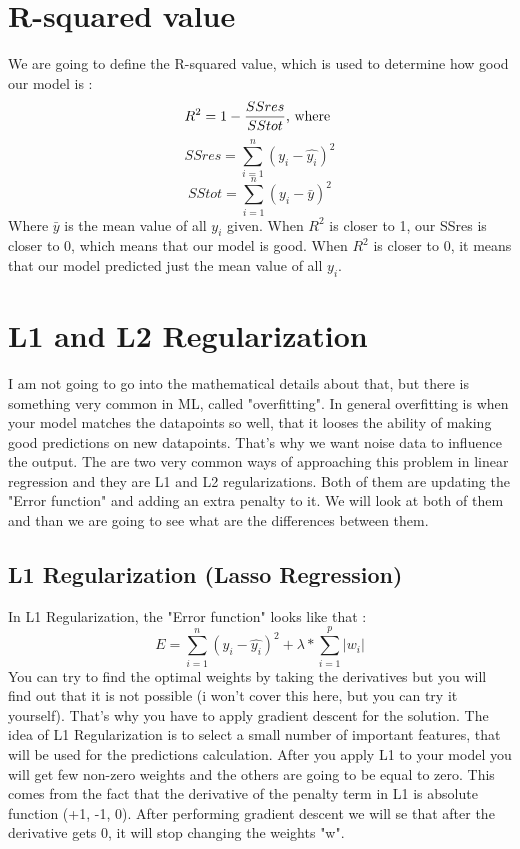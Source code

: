 \documentclass{article}
\begin{document}
\section{R-squared value}
We are going to define the R-squared value, which is used to determine how good our model is :
\begin{align*}
R^2 = 1 -  \frac{SSres \hfill}{SStot} \text{, where }
\end{align*}
\begin{equation*}
SSres = \sum_{i=1}^{n} (y_i - \hat{y_i}) ^ 2
\end{equation*}
\begin{equation*}
SStot = \sum_{i=1}^{n} (y_i - \bar{y}) ^ 2
\end{equation*}
Where $\bar{y}$ is the mean value of all $y_i$ given. When $R^2$ is closer to 1, our SSres is closer to 0, which means that our model is good. When $R^2$ is closer to 0, it means that our model predicted just the mean value of all $y_i$.

\section{L1 and L2 Regularization}
I am not going to go into the mathematical details about that, but there is something very common in ML, called "overfitting".  In general overfitting is when your model matches the datapoints so well, that it looses the ability of making good predictions on new datapoints.  That's why we want noise data to influence the output. The are two very common ways of approaching this problem in linear regression and they are L1 and L2 regularizations. Both of them are updating the "Error function" and adding an extra penalty to it. We will look at both of them and than we are going to see what are the differences between them.
\subsection{L1 Regularization (Lasso Regression)}
In L1 Regularization, the "Error function" looks like that :
\begin{equation*}
E = \sum_{i=1}^{n}(y_i - \hat{y_i})^2 + \lambda * \sum_{i=1}^{p}|w_i|
\end{equation*}
You can try to find the optimal weights by taking the derivatives but you will find out that it is not possible (i won't cover this here, but you can try it yourself). That's why you have to apply gradient descent for the solution. The idea of L1 Regularization is to select a small number of important features, that will
be used for the predictions calculation. After you apply L1 to your model you will get few non-zero weights and the others are going to be equal to zero.  This comes from the fact that the derivative of the penalty term in L1 is absolute function (+1, -1, 0). After performing gradient descent we will se that after the derivative gets 0, it will stop changing the weights "w".
\end{document}
